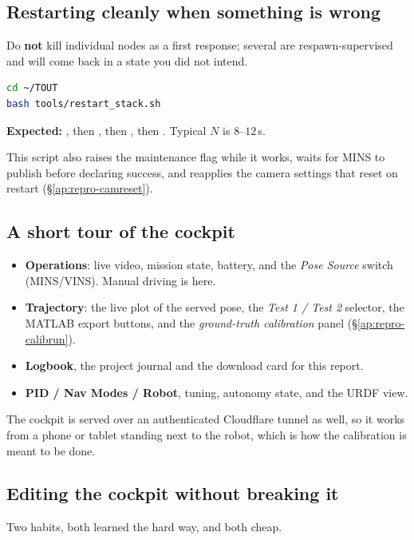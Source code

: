 \subsection{Restarting cleanly when something is wrong}
Do \textbf{not} kill individual nodes as a first response; several are
respawn-supervised and will come back in a state you did not intend.
\begin{lstlisting}[language=bash]
cd ~/TOUT
bash tools/restart_stack.sh
\end{lstlisting}
\textbf{Expected:} , then
, then , then
. Typical $N$ is $8$--$12$\,s.

This script also raises the maintenance flag while it works, waits for MINS to
publish before declaring success, and reapplies the camera settings that reset
on restart (\S\ref{ap:repro-camreset}).

\subsection{A short tour of the cockpit}
\begin{itemize}[leftmargin=1.4em]
\item \textbf{Operations}: live video, mission state, battery, and the
  \emph{Pose Source} switch (MINS/VINS). Manual driving is here.
\item \textbf{Trajectory}: the live plot of the served pose, the
  \emph{Test 1 / Test 2} selector, the MATLAB export buttons, and the
  \emph{ground-truth calibration} panel (\S\ref{ap:repro-calibrun}).
\item \textbf{Logbook}, the project journal and the download card for this
  report.
\item \textbf{PID / Nav Modes / Robot}, tuning, autonomy state, and the URDF
  view.
\end{itemize}
The cockpit is served over an authenticated Cloudflare tunnel as well, so it
works from a phone or tablet standing next to the robot, which is how the
calibration is meant to be done.

\subsection{Editing the cockpit without breaking it}
\label{ap:repro-editing-web}
Two habits, both learned the hard way, and both cheap.

